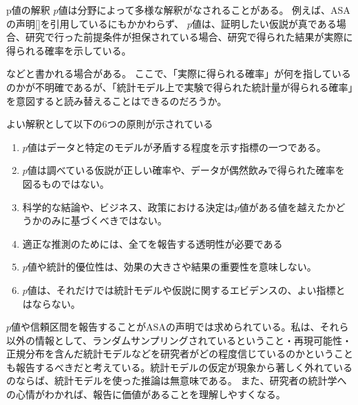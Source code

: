 \begin{SMbox}{p値の解釈}
$p$値は分野によって多様な解釈がなされることがある\cite{published_papers/18436201,2020医療統計解析使いこなし実践ガイド}。
例えば、ASAの声明[\cite{ASA_JA}]を引用しているにもかかわらず、
$p$値は、証明したい仮説が真である場合、研究で行った前提条件が担保されている場合、研究で得られた結果が実際に得られる確率を示している\cite{2020医療統計解析使いこなし実践ガイド}。

などと書かれる場合がある。
ここで、「実際に得られる確率」が何を指しているのかが不明確であるが、「統計モデル上で実験で得られた統計量が得られる確率」を意図すると読み替えることはできるのだろうか。
\fi

よい解釈として以下の6つの原則が示されている\cite{published_papers/18436201}
\begin{enumerate}
    \item $p$値はデータと特定のモデルが矛盾する程度を示す指標の一つである。
    \item $p$値は調べている仮説が正しい確率や、データが偶然飲みで得られた確率を図るものではない。
    \item 科学的な結論や、ビジネス、政策における決定は$p$値がある値を越えたかどうかのみに基づくべきではない。
    \item 適正な推測のためには、全てを報告する透明性が必要である
    \item $p$値や統計的優位性は、効果の大きさや結果の重要性を意味しない。
    \item $p$値は、それだけでは統計モデルや仮説に関するエビデンスの、よい指標とはならない。
\end{enumerate}

    $p$値や信頼区間を報告することがASAの声明では求められている。私は、それら以外の情報として、ランダムサンプリングされているということ・再現可能性・正規分布を含んだ統計モデルなどを研究者がどの程度信じているのかということも報告するべきだと考えている。統計モデルの仮定が現象から著しく外れているのならば、統計モデルを使った推論は無意味である。
    また、研究者の統計学への心情がわかれば、報告に価値があることを理解しやすくなる。
\fi 
\end{SMbox}

